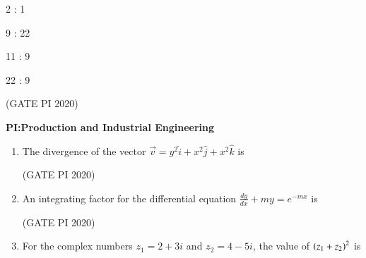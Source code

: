 \documentclass[journal,12pt,onecolumn]{IEEEtran}
\theoremstyle{remark}
\begin{document}
\begin{enumerate}
\begin{enumerate}
\begin{multicols}{2}
    \item 2 : 1
    \item 9 : 22
    \item 11 : 9
    \item 22 : 9
    \end{multicols}
\end{enumerate}

\hfill (GATE PI 2020)

\end{enumerate}
\textbf{PI:Production and Industrial Engineering}

\begin{enumerate}
    
\item The divergence of the vector $\vec{v} = y^2 \hat{i} + x^2 \hat{j} + x^2 \hat{k}$ is 
\begin{enumerate}
\end{enumerate}

\hfill (GATE PI 2020)

\item An integrating factor for the differential equation $\frac{dy}{dx} + my = e^{-mx}$ is 
\begin{enumerate}
\end{enumerate}

\hfill (GATE PI 2020)

\item For the complex numbers $z_1 = 2 + 3i$ and $z_2 = 4 - 5i$, the value of $\left(z_1 + z_2\right)^{2}$ is
\begin{enumerate}
\end{enumerate}


\end{enumerate}
\end{document}
